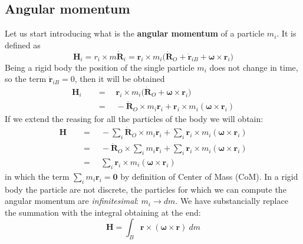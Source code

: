 \subsection{Angular momentum}
Let us start introducing what is the \textbf{angular momentum} of a particle $m_i$. It is defined as 
\begin{equation}
    \mathbf{H}_i=r_i\times m\dot{\mathbf{R}}_i=
    \mathbf{r}_i \times m_i \big( 
        \dot{\mathbf{R}}_O + 
        \dot{\mathbf{r}}_{iB}+\boldsymbol{\omega}\times\mathbf{r}_i
    \big)
\end{equation}
Being a rigid body the position of the single particle $m_i$ does not change in time, so the term $\dot{\mathbf{r}}_{iB}=0$, then it will be obtained
\begin{align*}
    \mathbf{H}_i \quad &= \quad \mathbf{r}_i \times m_i 
        \bigg( \dot{\mathbf{R}}_O +\boldsymbol{\omega}\times\mathbf{r}_i\bigg)\\
        &= \quad -\dot{\mathbf{R}}_O\times m_i\mathbf{r}_i+\mathbf{r}_i\times m_i(\boldsymbol{\omega}\times\mathbf{r}_i)
\end{align*}
If we extend the reasing for all the particles of the body we will obtain:
\begin{align*}
    \mathbf{H} \quad &= \quad 
    -\sum_i \dot{\mathbf{R}}_O\times m_i\mathbf{r}_i+
    \sum_i\mathbf{r}_i\times m_i(\boldsymbol{\omega}\times\mathbf{r}_i)\\
    &=\quad -\dot{\mathbf{R}}_O\times \sum_i  m_i\mathbf{r}_i+
    \sum_i\mathbf{r}_i\times m_i(\boldsymbol{\omega}\times\mathbf{r}_i)\\
    &=\quad \sum_i\mathbf{r}_i\times m_i(\boldsymbol{\omega}\times\mathbf{r}_i)
\end{align*}
in which the term $\sum_i  m_i\mathbf{r}_i=\mathbf{0}$ by definition of Center of Mass (CoM). In a rigid body the particle are not discrete, the particles for which we can compute the angular momentum are \textit{infinitesimal}: $m_i\to dm$. We have substancially replace the summation with the integral obtaining at the end:
\begin{equation}
    \mathbf{H} = \int_B{\mathbf{r}\times (\boldsymbol{\omega}\times\mathbf{r})} \ dm
\end{equation}

